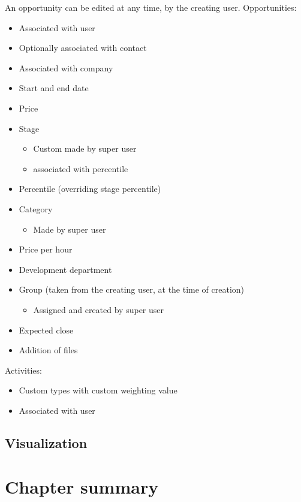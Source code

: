 An opportunity can be edited at any time, by the creating user.
Opportunities:
\begin{itemize}
  \item Associated with user
  \item Optionally associated with contact
  \item Associated with company
  \item Start and end date
  \item Price
  \item Stage
  \begin{itemize}
    \item Custom made by super user
    \item associated with percentile
  \end{itemize}
  \item Percentile (overriding stage percentile)
  \item Category
  \begin{itemize}
    \item Made by super user
  \end{itemize}
  \item Price per hour
  \item Development department
  \item Group (taken from the creating user, at the time of creation)
  \begin{itemize}
    \item Assigned and created by super user
  \end{itemize}
  \item Expected close
  \item Addition of files
\end{itemize}

Activities:
\begin{itemize}
  \item Custom types with custom weighting value
  \item Associated with user
\end{itemize}

\subsection{Visualization}
\label{sub:Visualization}


\section{Chapter summary}
\label{sec:Chapter summary}



